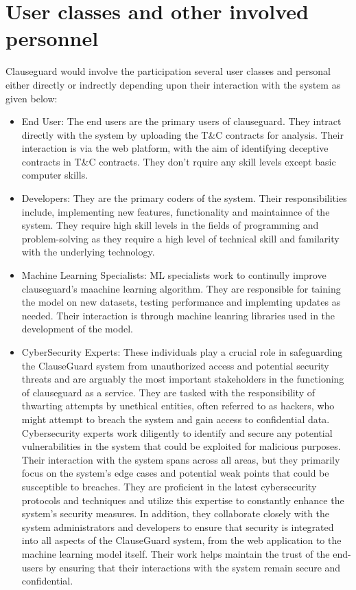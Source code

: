 \section{User classes and other involved personnel \label{Section::User Classes and other involved personnel proposed}}
Clauseguard would involve the participation several user classes and  personal either directly or indrectly depending upon their interaction with the system as given below: 
\begin{itemize}
    \item End User: The end users are the primary users of clauseguard. They intract directly with the system by uploading the T\&C contracts for analysis. Their interaction is via the web platform, with the aim of identifying deceptive contracts in T\&C contracts. They don't rquire any skill levels except basic computer skills. 
    \item Developers: They are the primary coders of the system. Their responsibilities include, implementing new features, functionality and maintainnce of the system. They require high skill levels in the fields of programming and problem-solving as they require a high level of technical skill and familarity with the underlying technology.
    \item Machine Learning Specialists: ML specialists work to continully improve clauseguard's maachine learning algorithm. They are responsible for taining the model on new datasets, testing performance and implemting updates as needed. Their interaction is through machine leanring libraries used in the development of the model. 
    \item CyberSecurity Experts: These individuals play a crucial role in safeguarding the ClauseGuard system from unauthorized access and potential security threats and are arguably the most important stakeholders in the functioning of clauseguard as a service. They are tasked with the responsibility of thwarting attempts by unethical entities, often referred to as hackers, who might attempt to breach the system and gain access to confidential data. Cybersecurity experts work diligently to identify and secure any potential vulnerabilities in the system that could be exploited for malicious purposes. Their interaction with the system spans across all areas, but they primarily focus on the system's edge cases and potential weak points that could be susceptible to breaches. They are proficient in the latest cybersecurity protocols and techniques and utilize this expertise to constantly enhance the system's security measures. In addition, they collaborate closely with the system administrators and developers to ensure that security is integrated into all aspects of the ClauseGuard system, from the web application to the machine learning model itself. Their work helps maintain the trust of the end-users by ensuring that their interactions with the system remain secure and confidential.

\end{itemize}
